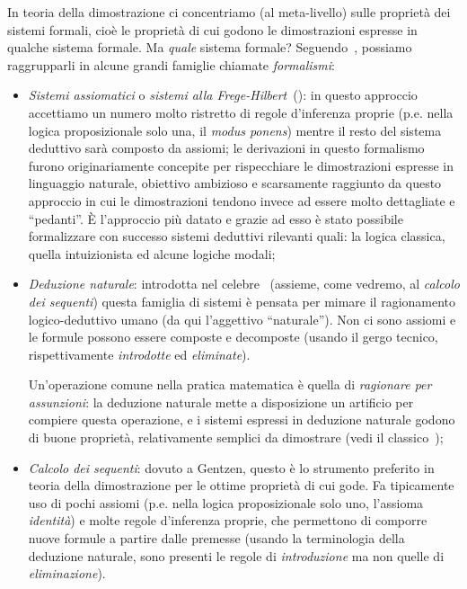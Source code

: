\documentclass[12pt,a4paper,openright,twoside]{report}
\begin{document}
In teoria della dimostrazione ci concentriamo (al meta-livello) sulle propriet\`a dei sistemi formali, cio\`e le propriet\`a di cui godono le dimostrazioni espresse in qualche sistema formale. Ma \emph{quale} sistema formale? Seguendo~\cite{TroSch96}, possiamo raggrupparli in alcune grandi famiglie chiamate \emph{formalismi}:
\begin{itemize}
	\item \emph{Sistemi assiomatici} o \emph{sistemi alla Frege-Hilbert}~(\cite{HilAck28, Fre79}): in questo approccio accettiamo un numero molto ristretto di regole d'inferenza proprie (p.e. nella logica proposizionale solo una, il \emph{modus ponens}) mentre il resto del sistema deduttivo sar\`a composto da assiomi; le derivazioni in questo formalismo furono originariamente concepite per rispecchiare le dimostrazioni espresse in linguaggio naturale, obiettivo ambizioso e scarsamente raggiunto da questo approccio in cui le dimostrazioni tendono invece ad essere molto dettagliate e ``pedanti''. \`E l'approccio pi\`u datato e grazie ad esso \`e stato possibile formalizzare con successo sistemi deduttivi rilevanti quali: la logica classica, quella intuizionista ed alcune logiche modali;
	\item \emph{Deduzione naturale}: introdotta nel celebre~\cite{Gen35} (assieme, come vedremo, al \emph{calcolo dei sequenti}) questa famiglia di sistemi \`e pensata per mimare il ragionamento logico-deduttivo umano (da qui l'aggettivo ``naturale''). Non ci sono assiomi e le formule possono essere composte e decomposte (usando il gergo tecnico, rispettivamente \emph{introdotte} ed \emph{eliminate}).

	Un'operazione comune nella pratica matematica \`e quella di \emph{ragionare per assunzioni}: la deduzione naturale mette a disposizione un artificio per compiere questa operazione, e i sistemi espressi in deduzione naturale godono di buone propriet\`a, relativamente semplici da dimostrare (vedi il classico~\cite{Pra65});

	\item \emph{Calcolo dei sequenti}: dovuto a Gentzen, questo \`e lo strumento preferito in teoria della dimostrazione per le ottime propriet\`a di cui gode. Fa tipicamente uso di pochi assiomi (p.e. nella logica proposizionale solo uno, l'assioma \emph{identit\`a}) e molte regole d'inferenza proprie, che permettono di comporre nuove formule a partire dalle premesse (usando la terminologia della deduzione naturale, sono presenti le regole di \emph{introduzione} ma non quelle di \emph{eliminazione}).
\end{itemize}
\end{document}
